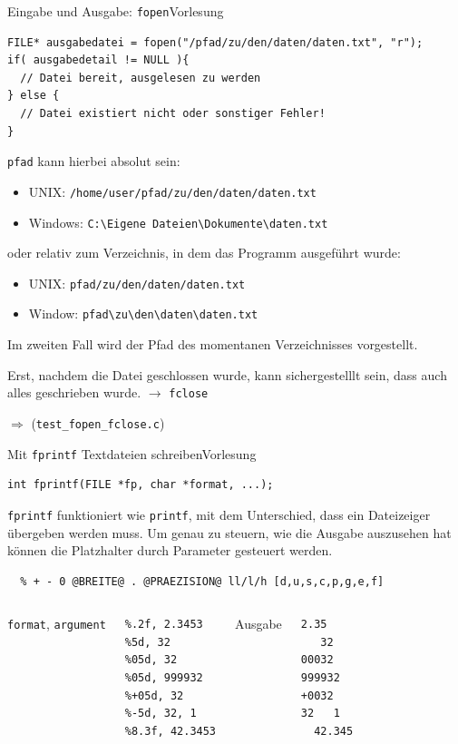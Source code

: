\documentclass[xcolor=dvipsnames]{beamer}
\newcounter{lecturecounter}
\begin{document}
\begin{frame}[fragile]{Eingabe und Ausgabe: \texttt{fopen}}{Vorlesung }
\begin{lstlisting}
FILE* ausgabedatei = fopen("/pfad/zu/den/daten/daten.txt", "r");
if( ausgabedetail != NULL ){
  // Datei bereit, ausgelesen zu werden
} else {
  // Datei existiert nicht oder sonstiger Fehler!
}
\end{lstlisting}
\vspace{-0.2cm}
\begin{block}{}
  \footnotesize
  \verb|pfad| kann hierbei absolut sein:
  \begin{itemize}
    \item{UNIX:    \verb|/home/user/pfad/zu/den/daten/daten.txt|}
    \item{Windows: \verb|C:\Eigene Dateien\Dokumente\daten.txt|}
  \end{itemize}
  oder relativ zum Verzeichnis, in dem das Programm ausgeführt wurde:
  \begin{itemize}
    \item{UNIX:    \verb|pfad/zu/den/daten/daten.txt|}
    \item{Window:  \verb|pfad\zu\den\daten\daten.txt|}
  \end{itemize}
  Im zweiten Fall wird der Pfad des momentanen Verzeichnisses vorgestellt.
\end{block}
\begin{block}{}
  \footnotesize
  Erst, nachdem die Datei geschlossen wurde, kann sichergestelllt sein, dass auch alles geschrieben wurde. $\rightarrow$ \texttt{fclose}
\end{block}
$\Rightarrow$ (\verb|test_fopen_fclose.c|)
\end{frame}

\begin{frame}[fragile]{Mit \texttt{fprintf} Textdateien schreiben}{Vorlesung }
\begin{lstlisting}
int fprintf(FILE *fp, char *format, ...);
\end{lstlisting}
\begin{block}{}
  \texttt{fprintf} funktioniert wie \texttt{printf}, mit dem Unterschied, dass ein Dateizeiger übergeben werden muss. Um genau zu steuern, wie die Ausgabe auszusehen hat können die Platzhalter durch Parameter gesteuert werden.
\end{block}
\begin{lstlisting}
  % + - 0 @BREITE@ . @PRAEZISION@ ll/l/h [d,u,s,c,p,g,e,f]  
\end{lstlisting}
\begin{columns}
\texttt{format}, \texttt{argument} 
\begin{lstlisting}
%.2f, 2.3453
%5d, 32
%05d, 32
%05d, 999932
%+05d, 32
%-5d, 32, 1
%8.3f, 42.3453
\end{lstlisting}
Ausgabe
\begin{lstlisting}
2.35
   32
00032
999932
+0032
32   1
  42.345
\end{lstlisting}
\end{columns}
\end{frame}
\end{document}
